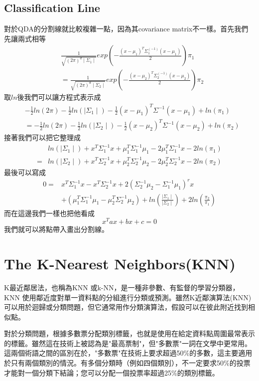 \documentclass[12pt, a4paper]{article}
\begin{document}
\subsection{Classification Line}
對於QDA的分割線就比較複雜一點，因為其covariance matrix不一樣。首先我們先讓兩式相等
\begin{align*}
&\frac{1}{\sqrt{(2\pi)^d\mid\Sigma_1\mid}}exp\left(-\frac{(x-\mu_1)^T\Sigma_1^{(-1)}(x-\mu_1)}{2}\right)\pi_1\\
&=\frac{1}{\sqrt{(2\pi)^d\mid\Sigma_2\mid}}exp\left(-\frac{(x-\mu_2)^T\Sigma_2^{(-1)}(x-\mu_2)}{2}\right)\pi_2
\end{align*}
取$ln$後我們可以讓方程式表示成
\begin{align*}
&-\frac{1}{2}ln(2\pi)-\frac{1}{2}ln(\mid\Sigma_1\mid)-\frac{1}{2}(x-\mu_1)^T\Sigma^{-1}(x-\mu_1)+ln(\pi_1)\\
&=-\frac{1}{2}ln(2\pi)-\frac{1}{2}ln(\mid\Sigma_2\mid)-\frac{1}{2}(x-\mu_2)^T\Sigma^{-1}(x-\mu_2)+ln(\pi_2)
\end{align*}
接著我們可以把它整理成
\begin{align*}
&ln(\mid\Sigma_1\mid)+x^T\Sigma_1^{-1}x+\mu_1^T\Sigma_1^{-1}\mu_1-2\mu_1^T\Sigma_1^{-1}x-2ln(\pi _1)\\
=&ln(\mid\Sigma_2\mid)+x^T\Sigma_2^{-1}x+\mu_2^T\Sigma_2^{-1}\mu_2-2\mu_2^T\Sigma_2^{-1}x-2ln(\pi _2)
\end{align*}
最後可以寫成
\begin{align*}
0=&x^T\Sigma_1^{-1}x-x^T\Sigma_2^{-1}x+2(\Sigma_2^{-1}\mu_2-\Sigma_1^{-1}\mu_1)^rx\\
&+(\mu_1^T\Sigma_1^{-1}\mu_1-\mu_2^T\Sigma_2^{-1}\mu_2)+ln\left(\frac{\mid\Sigma_1\mid}{\mid\Sigma_2\mid}\right)+2ln\left(\frac{\pi_2}{\pi_1}\right)
\end{align*}
而在這邊我們一樣也把他看成
$$x^Tax+bx+c=0$$
我們就可以將點帶入畫出分割線。


\section{The K-Nearest Neighbors(KNN)}
K最近鄰居法，也稱為KNN 或k-NN，是一種非參數、有監督的學習分類器，KNN 使用鄰近度對單一資料點的分組進行分類或預測。雖然K近鄰演算法(KNN) 可以用於迴歸或分類問題，但它通常用作分類演算法，假設可以在彼此附近找到相似點。

對於分類問題，根據多數票分配類別標籤，也就是使用在給定資料點周圍最常表示的標籤。雖然這在技術上被認為是"最高票制"，但"多數票"一詞在文學中更常用。這兩個術語之間的區別在於，"多數票"在技術上要求超過50\%的多數，這主要適用於只有兩個類別的情況。有多個分類時（例如四個類別），不一定要求50\%的投票才能對一個分類下結論；您可以分配一個投票率超過25\%的類別標籤。 
\end{document}
